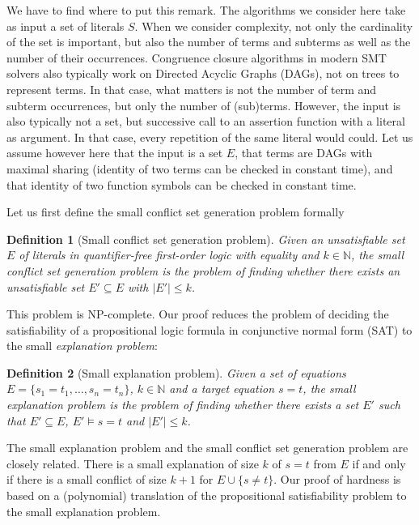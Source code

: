 \documentclass{easychair}
\newtheorem{definition}{Definition}
\begin{document}
We have to find where to put this remark.  The algorithms we consider here take as input a set of literals $S$.  When we consider complexity, not only the cardinality of the set is important, but also the number of terms and subterms as well as the number of their occurrences.  Congruence closure algorithms in modern SMT solvers also typically work on Directed Acyclic Graphs (DAGs), not on trees to represent terms.  In that case, what matters is not the number of term and subterm occurrences, but only the number of (sub)terms.  However, the input is also typically not a set, but successive call to an assertion function with a literal as argument.  In that case, every repetition of the same literal would could.  Let us assume however here that the input is a set $E$, that terms are DAGs with maximal sharing (identity of two terms can be checked in constant time), and that identity of two function symbols can be checked in constant time.


Let us first define the small conflict set generation problem formally
\begin{definition}[Small conflict set generation problem]
Given an unsatisfiable set $E$ of literals in quantifier-free first-order logic
with equality and $k \in \mathbb{N}$, the \emph{small conflict set generation
  problem} is the problem of finding whether there exists an unsatisfiable set
$E' \subseteq E$ with $|E'| \leq k$.
\end{definition}
\noindent This problem is NP-complete.  Our proof reduces the problem
of deciding the satisfiability of a propositional logic formula in conjunctive
normal form (SAT) to the small \emph{explanation problem}:
\begin{definition}[Small explanation problem]
Given a set of equations $E = \{ s_1 = t_1,\ldots, s_n = t_n\}$, $k \in
\mathbb{N}$ and a target equation $s = t$, the \emph{small explanation problem}
is the problem of finding whether there exists a set $E'$ such that $E'
\subseteq E$, $E' \models s = t$ and $|E'| \leq k$.
\end{definition}
\noindent The small explanation problem and the small conflict set generation
problem are closely related.  There is a small explanation of size $k$ of $s=t$
from $E$ if and only if there is a small conflict of size $k+1$ for $E \cup
\{s\neq t\}$.  Our proof of hardness is based on a (polynomial) translation of
the propositional satisfiability problem to the small explanation problem.
\end{document}
